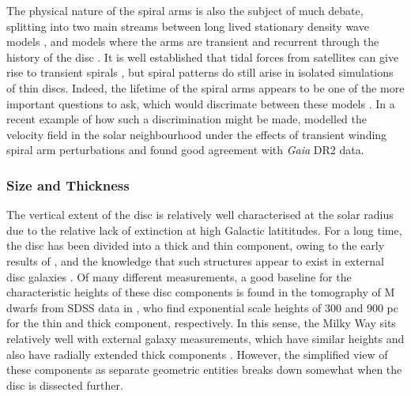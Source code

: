 The physical nature of the spiral arms is also the subject of much debate, splitting into two main streams between long lived stationary density wave models \citep[e.g.][]{1964ApJ...140..646L,1996ssgd.book.....B}, and models where the arms are transient and recurrent through the history of the disc \citep[e.g.][]{1981seng.proc..111T,1984ApJ...282...61S}. It is well established that tidal forces from satellites can give rise to transient spirals \citep[e.g.][]{2010MNRAS.403..625D}, but spiral patterns do still arise in isolated simulations of thin discs. Indeed, the lifetime of the spiral arms appears to be one of the more important questions to ask, which would discrimate between these models \citep{2011MNRAS.410.1637S}. In a recent example of how such a discrimination might be made, \citet{2018MNRAS.481.3794H} modelled the velocity field in the solar neighbourhood under the effects of transient winding spiral arm perturbations and found good agreement with \emph{Gaia} DR2 data. 

\subsubsection{Size and Thickness}
\label{sec:discsize}
The vertical extent of the disc is relatively well characterised at the solar radius due to the relative lack of extinction at high Galactic latititudes. For a long time, the disc has been divided into a thick and thin component, owing to the early results of \citet{1983MNRAS.202.1025G}, and the knowledge that such structures appear to exist in external disc galaxies \citep[e.g.][]{1979ApJ...234..829B,1979ApJ...234..842T,2006AJ....131..226Y}. Of many different measurements, a good baseline for the characteristic heights of these disc components is found in the tomography of M dwarfs from SDSS data in \citet{2008ApJ...673..864J}, who find exponential scale heights of 300 and 900 pc for the thin and thick component, respectively. In this sense, the Milky Way sits relatively well with external galaxy measurements, which have similar heights and also have radially extended thick components \citep[e.g][]{2006AJ....131..226Y}. However, the simplified view of these components as separate geometric entities breaks down somewhat when the disc is dissected further.

